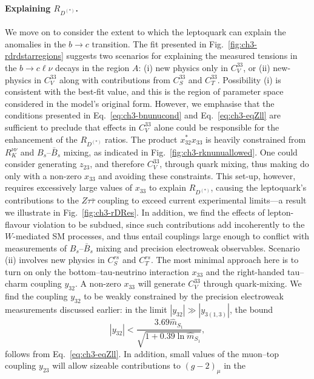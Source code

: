 \paragraph{Explaining $R_{D^{(*)}}$.} We move on to consider the extent to which
the leptoquark can explain the anomalies in the $b\to c$ transition. The fit
presented in Fig.~\ref{fig:ch3-rdrdstarregions} suggests two scenarios for
explaining the measured tensions in the $b \to c \ell \nu$ decays in the region
$A$: (i) new physics only in $C_V^{33}$, or (ii) new-physics in $C_V^{33}$ along
with contributions from $C_S^{33}$ and $C_T^{33}$. Possibility (i) is consistent
with the best-fit value, and this is the region of parameter space considered in
the model's original form. However, we emphasise that the conditions presented
in Eq.~\eqref{eq:ch3-bnunucond} and Eq.~\eqref{eq:ch3-eqZll} are sufficient to
preclude that effects in $C_V^{33}$ alone could be responsible for the
enhancement of the $R_{D^{(*)}}$ ratios. The product $x_{32}^* x_{33}$ is
heavily constrained from $R_K^{\nu\nu}$ and $B_s$--$\bar{B}_s$ mixing, as
indicated in Fig.~\ref{fig:ch3-rknunuallowed}. One could consider generating
$z_{23}$, and therefore $C_V^{33}$, through quark mixing, thus making do only
with a non-zero $x_{33}$ and avoiding these constraints. This set-up, however,
requires excessively large values of $x_{33}$ to explain $R_{D^{(*)}}$, causing
the leptoquark's contributions to the $Z\tau\bar{\tau}$ coupling to exceed
current experimental limits---a result we illustrate in
Fig.~\ref{fig:ch3-rDRes}. In addition, we find the effects of lepton-flavour
violation to be subdued, since such contributions add incoherently to the
$W$-mediated SM processes, and thus entail couplings large enough to conflict
with measurements of $B_s$--$\bar{B}_s$ mixing and precision electroweak
observables. Scenario (ii) involves new physics in $C_S^{rs}$ and $C_T^{rs}$.
The most minimal approach here is to turn on only the bottom--tau-neutrino
interaction $x_{33}$ and the right-handed tau--charm coupling $y_{32}$. A
non-zero $x_{33}$ will generate $C_V^{33}$ through quark-mixing. We find the
coupling $y_{32}$ to be weakly constrained by the precision electroweak
measurements discussed earlier: in the limit $|y_{32}| \gg |y_{3 (1,3)}|$, the
bound
\begin{equation}
  |y_{32}| < \frac{3.69 \hat{m}_{S_{1}}}{\sqrt{1 + 0.39 \ln \hat{m}_{S_{1}}}},
\end{equation}
follows from Eq.~\eqref{eq:ch3-eqZll}. In addition, small values of the muon--top
coupling $y_{23}$ will allow sizeable contributions to $(g-2)_\mu$ in the
